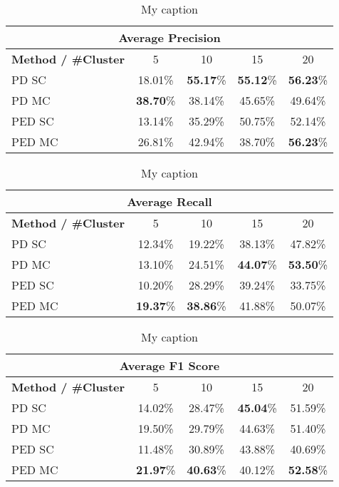 \begin{table}[H]
\centering
\begin{tabular}{|l|c|c|c|c|}
\hline
\multicolumn{5}{|c|}{Average Precision} \\ \hline
\textbf{Method / \#Cluster} & 5 & 10 & 15 & 20 \\ \hline
PD SC & 18.01\% & \textbf{55.17}\% & \textbf{55.12}\% & \textbf{56.23}\% \\ \hline
PD MC & \textbf{38.70}\% & 38.14\% & 45.65\% & 49.64\% \\ \hline
PED SC & 13.14\% & 35.29\% & 50.75\% & 52.14\%  \\ \hline
PED MC & 26.81\% & 42.94\% & 38.70\% & \textbf{56.23}\% \\ \hline
\end{tabular}
\caption{My caption}
\label{tab:chair_3_cast_avg_precision}
\end{table}

\begin{table}[H]
\centering
\begin{tabular}{|l|c|c|c|c|}
\hline
\multicolumn{5}{|c|}{Average Recall} \\ \hline
\textbf{Method / \#Cluster} & 5 & 10 & 15 & 20 \\ \hline
PD SC & 12.34\% & 19.22\% & 38.13\% & 47.82\% \\ \hline
PD MC & 13.10\% & 24.51\% & \textbf{44.07}\% & \textbf{53.50}\% \\ \hline
PED SC & 10.20\% & 28.29\% & 39.24\% & 33.75\% \\ \hline
PED MC & \textbf{19.37}\% & \textbf{38.86}\% & 41.88\% & 50.07\% \\ \hline
\end{tabular}
\caption{My caption}
\label{tab:chair_3_cast_avg_recall}
\end{table}

\begin{table}[H]
\centering
\begin{tabular}{|l|c|c|c|c|}
\hline
\multicolumn{5}{|c|}{Average F1 Score} \\ \hline
\textbf{Method / \#Cluster} & 5 & 10 & 15 & 20 \\ \hline
PD SC & 14.02\% & 28.47\% & \textbf{45.04}\% & 51.59\% \\ \hline
PD MC & 19.50\% & 29.79\% & 44.63\% & 51.40\% \\ \hline
PED SC & 11.48\% & 30.89\% & 43.88\% & 40.69\% \\ \hline
PED MC & \textbf{21.97}\% & \textbf{40.63}\% & 40.12\% & \textbf{52.58}\% \\ \hline
\end{tabular}
\caption{My caption}
\label{tab:chair_3_cast_avg_f1}
\end{table}




